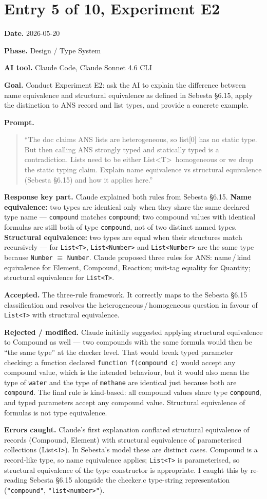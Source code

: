 \documentclass[11pt,a4paper]{article}
\newcommand{\field}[2]{\textbf{#1.} #2\par}
\newcommand{\prompt}[1]{%
  \textbf{Prompt.}
  \begin{quote}\small #1\end{quote}
}
\begin{document}
\section{Entry 5 of 10, Experiment E2}
\field{Date}{2026-05-20}
\field{Phase}{Design / Type System}
\field{AI tool}{Claude Code, Claude Sonnet 4.6 CLI}
\field{Goal}{Conduct Experiment E2: ask the AI to explain the difference between name equivalence and structural equivalence as defined in Sebesta \S6.15, apply the distinction to ANS record and list types, and provide a concrete example.}
\prompt{``The doc claims ANS lists are heterogeneous, so list[0] has no static type. But then calling ANS strongly typed and statically typed is a contradiction. Lists need to be either List\textless T\textgreater\ homogeneous or we drop the static typing claim. Explain name equivalence vs structural equivalence (Sebesta \S6.15) and how it applies here.''}
\field{Response key part}{Claude explained both rules from Sebesta \S6.15. \textbf{Name equivalence:} two types are identical only when they share the same declared type name --- \texttt{compound} matches \texttt{compound}; two compound values with identical formulas are still both of type \texttt{compound}, not of two distinct named types. \textbf{Structural equivalence:} two types are equal when their structures match recursively --- for \texttt{List<T>}, \texttt{List<Number>} and \texttt{List<Number>} are the same type because \texttt{Number} $\equiv$ \texttt{Number}. Claude proposed three rules for ANS: name\,/\,kind equivalence for Element, Compound, Reaction; unit-tag equality for Quantity; structural equivalence for \texttt{List<T>}.}
\field{Accepted}{The three-rule framework. It correctly maps to the Sebesta \S6.15 classification and resolves the heterogeneous\,/\,homogeneous question in favour of \texttt{List<T>} with structural equivalence.}
\field{Rejected / modified}{Claude initially suggested applying structural equivalence to Compound as well --- two compounds with the same formula would then be ``the same type'' at the checker level. That would break typed parameter checking: a function declared \texttt{function f(compound c)} would accept any compound value, which is the intended behaviour, but it would also mean the type of \texttt{water} and the type of \texttt{methane} are identical just because both are \texttt{compound}. The final rule is kind-based: all compound values share type \texttt{compound}, and typed parameters accept any compound value. Structural equivalence of formulas is not type equivalence.}
\field{Errors caught}{Claude's first explanation conflated structural equivalence of records (Compound, Element) with structural equivalence of parameterised collections (List\texttt{<T>}). In Sebesta's model these are distinct cases. Compound is a record-like type, so name equivalence applies; \texttt{List<T>} is parameterised, so structural equivalence of the type constructor is appropriate. I caught this by re-reading Sebesta \S6.15 alongside the checker.c type-string representation (\texttt{"compound"}, \texttt{"list<number>"}).}
\end{document}
